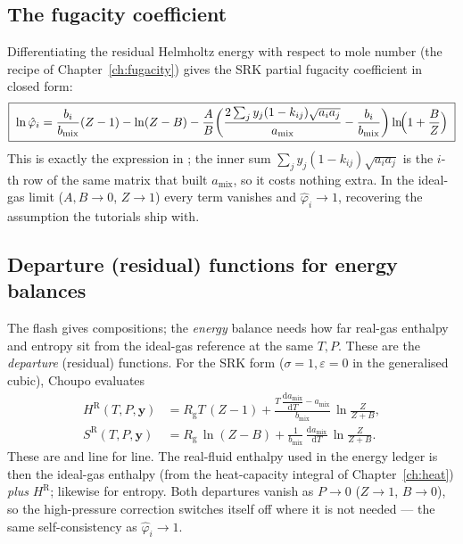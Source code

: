 \documentclass[11pt,a4paper]{article}
\newcommand{\Rgas}{R_{\!\mathrm{g}}}                %
\newcommand{\yv}{\mathbf{y}}
\begin{document}
\subsection{The fugacity coefficient}

Differentiating the residual Helmholtz energy with respect to mole
number (the recipe of Chapter~\ref{ch:fugacity}) gives the SRK
partial fugacity coefficient in closed form:
\begin{equation}
   \boxed{\;
   \ln\hat\varphi_i
   = \frac{b_i}{b_{\mathrm{mix}}}(Z - 1)
     - \ln(Z - B)
     - \frac{A}{B}\!\left(
        \frac{2\sum_j y_j (1-k_{ij})\sqrt{a_i a_j}}{a_{\mathrm{mix}}}
        - \frac{b_i}{b_{\mathrm{mix}}}\right)\ln\!\Bigl(1 + \frac{B}{Z}\Bigr)
   \;}
   \label{eq:srk-lnphi}
\end{equation}
This is exactly the expression in ; the inner sum
$\sum_j y_j(1-k_{ij})\sqrt{a_i a_j}$ is the $i$-th row of the same
matrix that built $a_{\mathrm{mix}}$, so it costs nothing extra.  In
the ideal-gas limit ($A,B\to 0$, $Z\to 1$) every term vanishes and
$\hat\varphi_i \to 1$, recovering the assumption the tutorials ship
with.

\subsection{Departure (residual) functions for energy balances}

The flash gives compositions; the \emph{energy} balance needs how far
real-gas enthalpy and entropy sit from the ideal-gas reference at the
same $T, P$.  These are the \emph{departure} (residual) functions.
For the SRK form ($\sigma = 1, \varepsilon = 0$ in the generalised
cubic), Choupo evaluates \cite{Sandler}
\begin{align}
   H^{\mathrm R}(T,P,\yv)
     &= \Rgas T\,(Z - 1)
        + \frac{T\,\dfrac{\mathrm d a_{\mathrm{mix}}}{\mathrm dT}
                - a_{\mathrm{mix}}}{b_{\mathrm{mix}}}\,
          \ln\!\frac{Z}{Z + B},
        \label{eq:srk-HR}\\[4pt]
   S^{\mathrm R}(T,P,\yv)
     &= \Rgas\,\ln(Z - B)
        + \frac{1}{b_{\mathrm{mix}}}\,
          \frac{\mathrm d a_{\mathrm{mix}}}{\mathrm dT}\,
          \ln\!\frac{Z}{Z + B}.
        \label{eq:srk-SR}
\end{align}
These are  and  line for
line.  The real-fluid enthalpy used in the energy ledger is then the
ideal-gas enthalpy (from the heat-capacity integral of
Chapter~\ref{ch:heat}) \emph{plus} $H^{\mathrm R}$; likewise for
entropy.  Both departures vanish as $P\to 0$ ($Z\to 1$, $B\to 0$),
so the high-pressure correction switches itself off where it is not
needed --- the same self-consistency as $\hat\varphi_i\to 1$.
\end{document}
